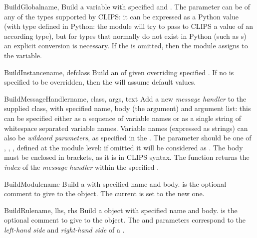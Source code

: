 \begin{funcdesc}{BuildGlobal}{name, }
Build a  variable with specified  and .
The  parameter can be of any of the types supported by CLIPS:
it can be expressed as a Python value (with type defined in Python: the
module will try to pass to CLIPS a value of an according type), but for
types that normally do not exist in Python (such as s) an
explicit conversion is necessary. If the  is omitted, then
the module assigns  to the variable.
\end{funcdesc}

\begin{funcdesc}{BuildInstance}{name, defclass }
Build an  of given  overriding specified
. If no  is specified to be overridden, then the
 will assume default values.
\end{funcdesc}

\begin{methoddesc}{BuildMessageHandler}{name, class, args, text }
Add a new \emph{message handler} to the supplied class, with specified
name, body (the  argument) and argument list: this can be
specified either as a sequence of variable names or as a single string
of whitespace separated variable names. Variable names (expressed as
strings) can also be \emph{wildcard parameters}, as specified in the
\clipsbpg{}. The  parameter should be one of ,
, ,  defined at the module level:
if omitted it will be considered as . The body must be
enclosed in brackets, as it is in CLIPS syntax. The function returns
the \emph{index} of the \emph{message handler} within the specified
.
\end{methoddesc}

\begin{funcdesc}{BuildModule}{name }
Build a  with specified name and body.  is
the optional comment to give to the object. The current 
is set to the new one.
\end{funcdesc}

\begin{funcdesc}{BuildRule}{name, lhs, rhs }
Build a  object with specified name and body. 
is the optional comment to give to the object. The  and
 parameters correspond to the \emph{left-hand side} and
\emph{right-hand side} of a .
\end{funcdesc}

